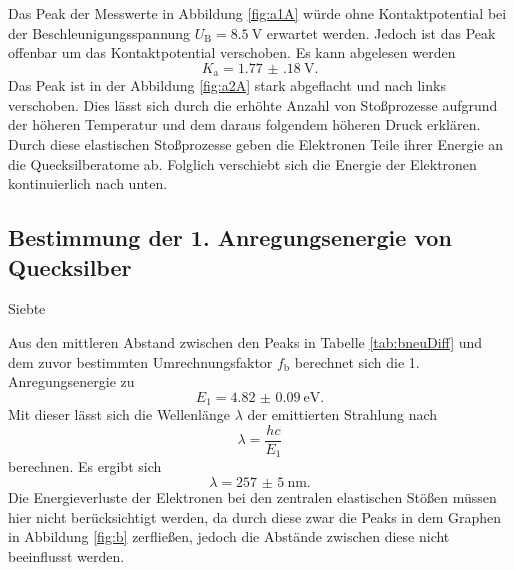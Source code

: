 Das Peak der Messwerte in Abbildung \ref{fig:a1A} würde ohne Kontaktpotential bei der Beschleunigungsspannung $U_\text{B}=\SI{8.5}{\volt}$ erwartet werden. Jedoch ist das Peak offenbar um das Kontaktpotential verschoben.
Es kann abgelesen werden
\begin{displaymath}
K_\text{a}=\SI{1.77(18)}{\volt}\text{.}
\end{displaymath}
Das Peak ist in der Abbildung \ref{fig:a2A} stark abgeflacht und nach links verschoben. Dies lässt sich durch die erhöhte Anzahl von Stoßprozesse aufgrund der höheren Temperatur und dem daraus folgendem höheren Druck erklären. Durch diese elastischen Stoßprozesse geben die Elektronen Teile ihrer Energie an die Quecksilberatome ab. Folglich verschiebt sich die Energie der Elektronen kontinuierlich nach unten.


\subsection{Bestimmung der 1. Anregungsenergie von Quecksilber}
\begin{table}
	\caption{Siebte}
	\centering
	
\end{table}
Aus den mittleren Abstand zwischen den Peaks in Tabelle \ref{tab:bneuDiff} und dem zuvor bestimmten Umrechnungsfaktor $f_\text{b}$ berechnet sich die 1. Anregungsenergie zu
\begin{displaymath}
	E_1=\SI{4.82(9)}{\electronvolt}\text{.}
\end{displaymath}
Mit dieser lässt sich die Wellenlänge $\lambda$ der emittierten Strahlung nach 
\begin{equation}
\lambda = \frac{h  c}{E_1}
\end{equation}
berechnen.
Es ergibt sich
\begin{displaymath}
\lambda=\SI{257(5)}{\nano\meter}\text{.}
\end{displaymath}
Die Energieverluste der Elektronen bei den zentralen elastischen Stößen müssen hier nicht berücksichtigt werden, da durch diese zwar die Peaks in dem Graphen in Abbildung \ref{fig:b} zerfließen, jedoch die Abstände zwischen diese nicht beeinflusst werden.


